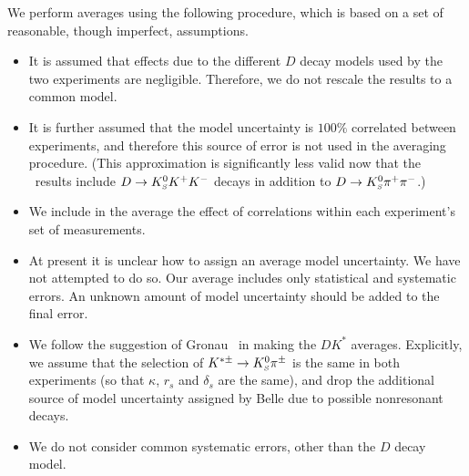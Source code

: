 We perform averages using the following procedure, which is based on a set of
reasonable, though imperfect, assumptions. 

\begin{itemize}\setlength{\itemsep}{0.5ex}
\item 
  It is assumed that effects due to the different $D$ decay models 
  used by the two experiments are negligible. 
  Therefore, we do not rescale the results to a common model.
\item 
  It is further assumed that the model uncertainty is $100\%$ 
  correlated between experiments, 
  and therefore this source of error is not used in the averaging procedure.
  (This approximation is significantly less valid now that the \babar\ results
  include $D \to K^0_{\scriptscriptstyle S} K^+K^-$ decays in addition to $D \to K^0_{\scriptscriptstyle S}\pi^+\pi^-$.)
\item 
  We include in the average the effect of correlations 
  within each experiment's set of measurements.
\item 
  At present it is unclear how to assign an average model uncertainty. 
  We have not attempted to do so. 
  Our average includes only statistical and systematic errors. 
  An unknown amount of model uncertainty should be added to the final error.
\item 
  We follow the suggestion of Gronau~\cite{Gronau:2002mu} 
  in making the $DK^*$ averages. 
  Explicitly, we assume that the selection of $K^{*\pm} \to K^0_{\scriptscriptstyle S}\pi^\pm$
  is the same in both experiments 
  (so that $\kappa$, $r_s$ and $\delta_s$ are the same), 
  and drop the additional source of model uncertainty 
  assigned by Belle due to possible nonresonant decays.
\item 
  We do not consider common systematic errors, 
  other than the $D$ decay model. 
\end{itemize}



